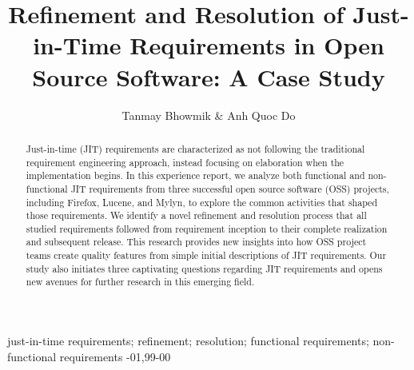 \documentclass[review]{elsarticle}
\begin{document}
\begin{frontmatter}

\title{Refinement and Resolution of Just-in-Time Requirements in Open Source Software: A Case Study}


\author{Tanmay Bhowmik \& Anh Quoc Do}
\address{Department of Computer Science and Engineering\\Mississippi State University, USA}




\begin{abstract}
Just-in-time (JIT) requirements are characterized as not following the traditional requirement engineering approach, instead focusing on elaboration when the implementation begins. In this experience report, we analyze both functional and non-functional JIT requirements from three successful open source software (OSS) projects, including Firefox, Lucene, and Mylyn, to explore the common activities that shaped those requirements. We identify a novel refinement and resolution process that all studied requirements followed from requirement inception to their complete realization and subsequent release. This research provides new insights into how OSS project teams create quality features from simple initial descriptions of JIT requirements. Our study also initiates three captivating questions regarding JIT requirements and opens new avenues for further research in this emerging field.
\end{abstract}

\begin{keyword}
just-in-time requirements; refinement; resolution; functional requirements; non-functional requirements
-01\sep  99-00
\end{keyword}

\end{frontmatter}
\end{document}
